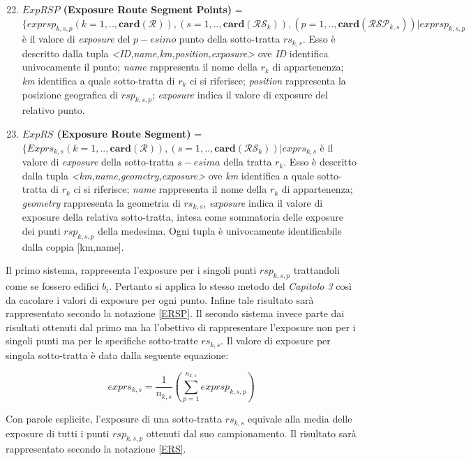 \begin{enumerate}
\setcounter{enumi}{21}
\item \label{ERSP} \textbf{$ExpRSP$ (Exposure Route Segment Points)} =\\
$ \{exprsp_{k,s,p} (k=1,..,\mathbf{card}(\mathcal{R})),(s=1,..,\mathbf{card}(\mathcal{RS}_k)),(p=1,..,\mathbf{card}(\mathcal{RSP}_{k,s}))  | exprsp_{k,s,p} $ è il valore di \textit{exposure} del $p-esimo$ punto della sotto-tratta $rs_{k,s}$. Esso è descritto dalla tupla \textit{<ID,name,km,position,exposure>} ove \textit{ID} identifica univocamente il punto; \textit{name} rappresenta il nome della $r_k$ di appartenenza; \textit{km} identifica a quale sotto-tratta di $r_k$ ci si riferisce; \textit{position} rappresenta la posizione geografica di $rsp_{k,s,p}$; \textit{exposure} indica il valore di exposure del relativo punto.

\item \label{ERS} \textbf{$ExpRS$ (Exposure Route Segment)} =\\$ \{Exprs_{k,s} (k=1,..,\mathbf{card}(\mathcal{R})),(s=1,..,\mathbf{card}(\mathcal{RS}_k)) | exprs_{k,s} $ è il valore di \textit{exposure} della sotto-tratta $s-esima$ della tratta $r_k$. Esso è descritto dalla tupla \textit{<km,name,geometry,exposure>} ove \textit{km} identifica a quale sotto-tratta di $r_k$ ci si riferisce; \textit{name} rappresenta il nome della $r_k$ di appartenenza; \textit{geometry} rappresenta la geometria di $rs_{k,s}$, \textit{exposure} indica il valore di exposure della relativa sotto-tratta, intesa come sommatoria delle exposure dei punti $rsp_{k,s,p}$ della medesima. Ogni tupla è univocamente identificabile dalla coppia [km,name].

\end{enumerate}
\noindent Il primo sistema, rappresenta l'exposure per i singoli punti $rsp_{k,s,p}$ trattandoli come se fossero edifici $b_i$. Pertanto si applica lo stesso metodo del \textit{Capitolo 3} così da cacolare i valori di exposure per ogni punto. Infine tale risultato sarà rappresentato secondo la notazione \ref{ERSP}.
\bigbreak
\noindent Il secondo sistema invece parte dai risultati ottenuti dal primo ma ha l'obettivo di rappresentare l'exposure non per i singoli punti ma per le specifiche sotto-tratte $rs_{k,s}$. Il valore di exposure per singola sotto-tratta è data dalla seguente equazione:

\begin{equation}\label{eq:exprs}
exprs_{k,s}=\frac{1}{n_{k,s}}\left(\sum_{p=1}^{n_{k,s}} exprsp_{k,s,p}\right)
\end{equation}


\noindent Con parole esplicite, l'exposure di una sotto-tratta $rs_{k,s}$ equivale alla media delle exposure di tutti i punti $rsp_{k,s,p}$ ottenuti dal suo campionamento. Il risultato sarà rappresentato secondo la notazione \ref{ERS}.
